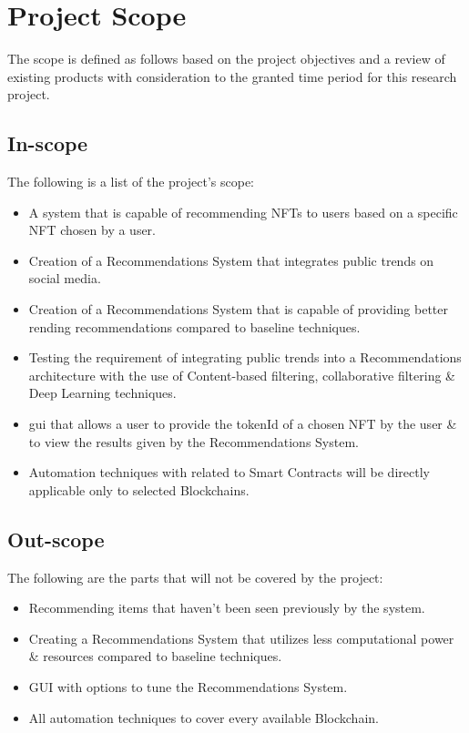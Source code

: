 \documentclass[a4paper, 12pt, oneside]{report}
\begin{document}
\chapter{Project Scope}
The scope is defined as follows based on the project objectives and a review of existing products with consideration to the granted time period for this research project.

\section{In-scope}
The following is a list of the project's scope:
\begin{itemize}
\item A system that is capable of recommending NFTs to users based on a specific NFT chosen by a user.
\item Creation of a Recommendations System that integrates public trends on social media.
\item Creation of a Recommendations System that is capable of providing better rending recommendations compared to baseline techniques.
\item Testing the requirement of integrating public trends into a Recommendations architecture with the use of Content-based filtering, collaborative filtering \& Deep Learning techniques.
\item \Gls{gui} that allows a user to provide the tokenId of a chosen NFT by the user \& to view the results given by the Recommendations System.
\item Automation techniques with related to Smart Contracts will be directly applicable only to selected Blockchains.
\end{itemize}

\section{Out-scope}
The following are the parts that will not be covered by the project:
\begin{itemize}
\item Recommending items that haven't been seen previously by the system.
\item Creating a Recommendations System that utilizes less computational power \& resources compared to baseline techniques.
\item GUI with options to tune the Recommendations System.
\item All automation techniques to cover every available Blockchain.
\end{itemize}
\end{document}
